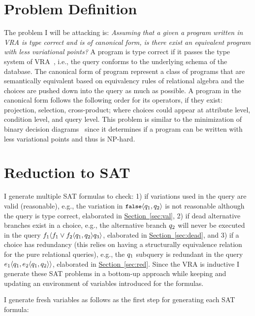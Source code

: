 \documentclass[12pt]{article}
\newcommand{\secref}[1]{\hyperref[sec:#1]{Section~\ref*{sec:#1}}}
\begin{document}
 

\section{Problem Definition}
\label{sec:def}

The problem I will be attacking is:
\emph{Assuming that a given a program written in VRA is type correct
and is of canonical form, is there exist an equivalent program 
with less variational points?}
A program is type correct if it passes the type system of VRA~\cite{vldbArXiv},
i.e., the query conforms to the underlying schema of the database.
The canonical form of program represent a class of programs that are 
semantically equivalent based on equivalency rules of relational algebra 
and the choices are pushed down into the query as much as possible.
A program in the canonical form follows the following
order for its operators, if they exist: projection, selection, cross-product; where
choices could appear at attribute level, condition level, and query level.
This problem is similar to the minimization of binary decision diagrams~\cite{minBDD}
since it determines if a program can be written with less variational points
and thus is NP-hard.




\section{Reduction to SAT}
\label{sec:reduce}
I generate multiple SAT formulas to check:
1) if variations used in the query are valid (reasonable),
e.g., the variation in $\chc [\f] {\vQ_1, \vQ_2}$ is not reasonable 
although the query is type correct, elaborated in \secref{val},
2) if dead alternative branches exist in a choice, e.g., 
the alternative branch $\vQ_2$ will never be executed in the 
query $\chc [\fName_1] {\chc [\fName_1 \vee \fName_2] {\vQ_1, \vQ_2} \vQ_3}$, 
elaborated in \secref{dead},
and 
3) if a choice has redundancy (this relies on having a structurally equivalence
relation for the pure relational queries), e.g., the $\vQ_1$ subquery is redundant in the query 
$\chc [\dimMeta_1] {\vQ_1, \chc [\dimMeta_2] {\vQ_1, \vQ_2}}$, elaborated in \secref{red}.
Since the VRA is inductive I generate these SAT problems in a bottom-up
approach while keeping and updating an environment of variables introduced 
for the formulas.

I generate fresh variables as follows as the first step for generating each SAT formula:
\end{document}
